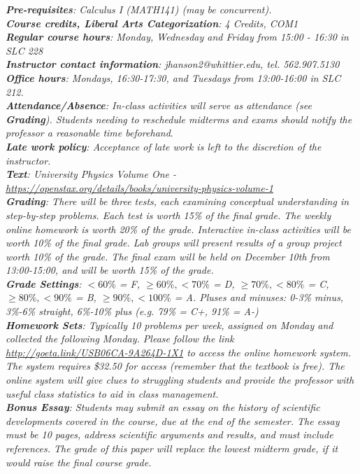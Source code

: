 \documentclass[10pt]{article}
\begin{document}
\noindent
\textit{\textbf{Pre-requisites}: Calculus I (MATH141) (may be concurrent).} \\
\textit{\textbf{Course credits, Liberal Arts Categorization}: 4 Credits, COM1} \\
\textit{\textbf{Regular course hours}: Monday, Wednesday and Friday from 15:00 - 16:30 in SLC 228} \\
\textit{\textbf{Instructor contact information}: jhanson2@whittier.edu, tel. 562.907.5130} \\
\textit{\textbf{Office hours}: Mondays, 16:30-17:30, and Tuesdays from 13:00-16:00 in SLC 212.} \\
\textit{\textbf{Attendance/Absence}: In-class activities will serve as attendance (see \textbf{Grading}). Students needing to reschedule
midterms and exams should notify the professor a reasonable time beforehand}.\\ 
\textit{\textbf{Late work policy}: Acceptance of late work is left to the discretion of the instructor.} \\
\textit{\textbf{Text}: University Physics Volume One - \url{https://openstax.org/details/books/university-physics-volume-1}} \\
\textit{\textbf{Grading}: There will be three tests, each examining conceptual understanding in step-by-step problems. Each test is
worth 15\% of the final grade. The weekly online homework is worth 20\% of the grade. Interactive in-class activities will be worth 10\% of the final grade. Lab groups will present results of a group project worth 10\% of the grade. The final exam will be held on December 10th from 13:00-15:00, and will be worth 15\% of the grade.} \\
\textit{\textbf{Grade Settings}: $<60\%$ = F, $\geq 60\%, <70\%$ = D, $\geq 70\%, <80\%$ = C, $\geq 80\%, <90\%$ = B, $\geq 90\%, <100\%$ = A.  Pluses and minuses: 0-3\% minus, 3\%-6\% straight, 6\%-10\% plus (e.g. 79\% = C+, 91\% = A-)} \\
\textit{\textbf{Homework Sets}: Typically 10 problems per week, assigned on Monday and collected the following Monday. Please follow the link \url{http://goeta.link/USB06CA-9A264D-1X1} to access the online homework system. The system requires \$32.50 for access (remember that the textbook is free). The online system will give clues to struggling students and provide the professor with useful class statistics to aid in class management.} \\
\textit{\textbf{Bonus Essay}: Students may submit an essay on the history of scientific developments covered in the course, due at
the end of the semester. The essay must be 10 pages, address scientific arguments and results, and must include
references. The grade of this paper will replace the lowest midterm grade, if it would raise the final course grade.} \\
\end{document}
